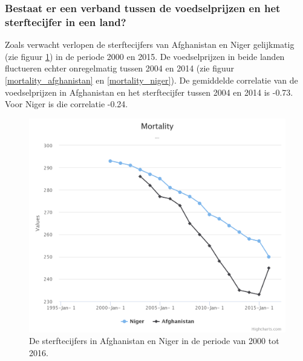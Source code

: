 \documentclass{article}
\begin{document}
        
 



 
 
 
 



\newpage
\subsubsection*{Bestaat er een verband tussen de voedselprijzen en het sterftecijfer in een land?}
Zoals verwacht verlopen de sterftecijfers van Afghanistan en Niger gelijkmatig (zie figuur \ref{fig_sterfte}) in de periode 2000 en 2015.
De voedselprijzen in beide landen fluctueren echter onregelmatig tussen 2004 en 2014 (zie figuur \ref{mortality_afghanistan} en \ref{mortality_niger}). De gemiddelde correlatie van de voedselprijzen in Afghanistan en het sterftecijfer tussen 2004 en 2014 is -0.73. Voor Niger is die correlatie -0.24.

\begin{figure}[h!]
    \centering
    \includegraphics[scale=0.25]{images/mortality_rates_1.png}
    \caption{De sterftecijfers in Afghanistan en Niger in de periode van 2000 tot 2016.}
    \medskip
    \small
    \label{fig_sterfte}
    \end{figure}
\end{document}
